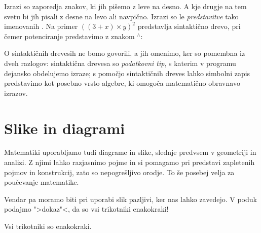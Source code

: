 Izrazi so zaporedja znakov, ki jih pišemo z leve na desno. A kje drugje na tem svetu bi jih pisali z desne na levo ali
navpično. Izrazi so le \emph{predstavitve} tako imenovanih . Na primer $((3 + x) \times y)^2$ predstavlja sintaktično drevo, pri čemer potenciranje predstavimo z znakom ${}^{\wedge}$:
%
\begin{center}
\end{center}
%
O sintaktičnih drevesih ne bomo govorili, a jih omenimo, ker so pomembna iz dveh razlogov: sintaktična drevesa so
\emph{podatkovni tip}, s katerim v programu dejansko obdelujemo izraze; s pomočjo sintaktičnih dreves lahko simbolni zapis predstavimo kot posebno vrsto algebre, ki omogoča matematično obravnavo izrazov.


\section{Slike in diagrami}
\label{sec:slike-in-diagrami}

Matematiki uporabljamo tudi diagrame in slike, slednje predvsem v geometriji in analizi. Z
njimi lahko razjasnimo pojme in si pomagamo pri predstavi zapletenih pojmov in
konstrukcij, zato so nepogrešljivo orodje. To še posebej velja za poučevanje matematike.

Vendar pa moramo biti pri uporabi slik pazljivi, ker nas lahko zavedejo. V poduk podajmo ">dokaz"<, da so vsi trikotniki enakokraki!

\begin{izrek}
  Vsi trikotniki so enakokraki.
\end{izrek}

